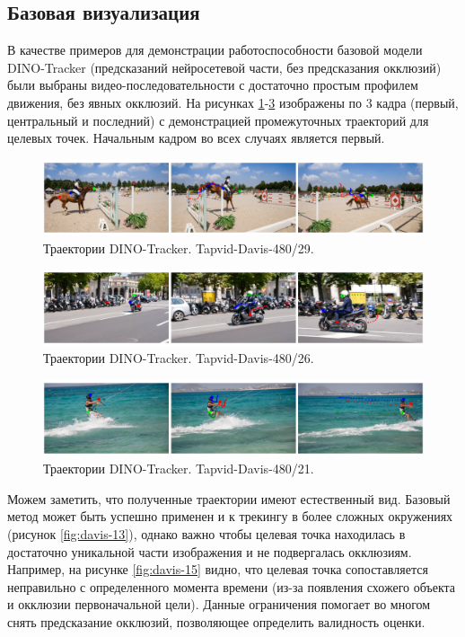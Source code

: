 \documentclass[a4paper, 14pt]{extarticle}
\theoremstyle{definition}
\theoremstyle{plain}
\theoremstyle{remark}
\begin{document}
\subsection{Базовая визуализация}
В качестве примеров для демонстрации работоспособности базовой модели DINO-Tracker (предсказаний нейросетевой части, без предсказания окклюзий) были выбраны видео-последовательности с достаточно простым профилем движения, без явных окклюзий. На рисунках \ref{fig:davis-29}-\ref{fig:davis-21} изображены по 3 кадра (первый, центральный и последний) с демонстрацией промежуточных траекторий для целевых точек. Начальным кадром во всех случаях является первый.
\begin{figure}
    [H]
    \centering
    \includegraphics[width=\textwidth]{figs/davis-29.png}
    \caption{Траектории DINO-Tracker. Tapvid-Davis-480/29.}
    \label{fig:davis-29}
\end{figure}
\begin{figure}
    [H]
    \centering
    \includegraphics[width=\textwidth]{figs/davis-26.png}
    \caption{Траектории DINO-Tracker. Tapvid-Davis-480/26.}
    \label{fig:davis-26}
\end{figure}
\begin{figure}
    [H]
    \centering
    \includegraphics[width=\textwidth]{figs/davis-21.png}
    \caption{Траектории DINO-Tracker. Tapvid-Davis-480/21.}
    \label{fig:davis-21}
\end{figure}

Можем заметить, что полученные траектории имеют естественный вид. 
Базовый метод может быть успешно применен и к трекингу в более сложных окружениях 
(рисунок \ref{fig:davis-13}), однако важно чтобы целевая точка находилась в достаточно 
уникальной части изображения и не подвергалась окклюзиям. Например, на рисунке 
\ref{fig:davis-15} видно, что целевая точка сопоставляется неправильно с определенного 
момента времени (из-за появления схожего объекта и окклюзии первоначальной цели). 
Данные ограничения помогает во многом снять предсказание окклюзий, позволяющее определить валидность оценки.
\end{document}
